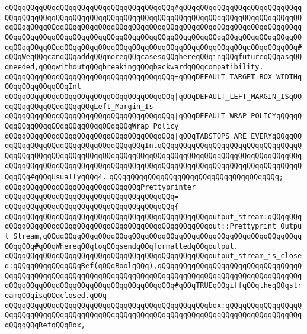 \verb|qQQqqQQqqQQqqQQqqQQqqQQqqQQqqQQqqQQqqQQq#qQQqqQQqqQQqqQQqqQQqqQQqqQQqqQQqqQQqqQQqqQQqqQQqqQQqqQQqqQQqqQQqqQQqqQQqqQQqqQQqqQQqqQQqqQQqqQQqqQQqqQQqqQQqqQQqqQQqqQQqqQQqqQQqqQQqqQQqqQQqqQQqqQQqqQQqqQQqqQQqqQQqqQQqqQQqqQQqqQQqqQQqqQQqqQQqqQQqqQQqqQQqqQQqqQQqqQQqqQQqqQQqqQQqqQQqqQQqqQQqqQQqqQQqqQQqqQQqqQQqqQQqqQQqqQQqqQQqqQQqqQQqqQQqqQQqqQQqqQQqqQQqqQQq#qQQqWeqQQqcanqQQqaddqQQqmoreqQQqcasesqQQqhereqQQqinqQQqfutureqQQqasqQQqneeded,qQQqwithoutqQQqbreakingqQQqbackwardqQQqcompatibility.|\newline
\verb|qQQqqQQqqQQqqQQqqQQqqQQqqQQqqQQqqQQqqQQq=qQQqDEFAULT_TARGET_BOX_WIDTHqQQqqQQqqQQqqQQqInt|\newline
\verb|qQQqqQQqqQQqqQQqqQQqqQQqqQQqqQQqqQQqqQQq|\verb#|qQQqDEFAULT_LEFT_MARGIN_ISqQQqqQQqqQQqqQQqqQQqqQQqLeft_Margin_Is#\newline
\verb|qQQqqQQqqQQqqQQqqQQqqQQqqQQqqQQqqQQqqQQq|\verb#|qQQqDEFAULT_WRAP_POLICYqQQqqQQqqQQqqQQqqQQqqQQqqQQqqQQqqQQqWrap_Policy#\newline
\verb|qQQqqQQqqQQqqQQqqQQqqQQqqQQqqQQqqQQqqQQq|\verb#|qQQqTABSTOPS_ARE_EVERYqQQqqQQqqQQqqQQqqQQqqQQqqQQqqQQqqQQqqQQqIntqQQqqQQqqQQqqQQqqQQqqQQqqQQqqQQqqQQqqQQqqQQqqQQqqQQqqQQqqQQqqQQqqQQqqQQqqQQqqQQqqQQqqQQqqQQqqQQqqQQqqQQqqQQqqQQqqQQqqQQqqQQqqQQqqQQqqQQqqQQqqQQqqQQqqQQqqQQqqQQqqQQqqQQqqQQqqQQqqQQq#\verb|#qQQqUsuallyqQQq4.|\newline
\verb|qQQqqQQqqQQqqQQqqQQqqQQqqQQqqQQqqQQqqQQq;|\newline
\newline
\verb|qQQqqQQqqQQqqQQqqQQqqQQqqQQqqQQqPrettyprinter|\newline
\verb|qQQqqQQqqQQqqQQqqQQqqQQqqQQqqQQqqQQqqQQq=|\newline
\verb|qQQqqQQqqQQqqQQqqQQqqQQqqQQqqQQqqQQqqQQq{|\newline
\verb|qQQqqQQqqQQqqQQqqQQqqQQqqQQqqQQqqQQqqQQqqQQqqQQqoutput_stream:qQQqqQQqqQQqqQQqqQQqqQQqqQQqqQQqqQQqqQQqqQQqqQQqqQQqqQQqout::Prettyprint_Output_Stream,qQQqqQQqqQQqqQQqqQQqqQQqqQQqqQQqqQQqqQQqqQQqqQQqqQQqqQQqqQQqqQQqqQQq#qQQqWhereqQQqtoqQQqsendqQQqformattedqQQqoutput.|\newline
\verb|qQQqqQQqqQQqqQQqqQQqqQQqqQQqqQQqqQQqqQQqqQQqqQQqoutput_stream_is_closed:qQQqqQQqqQQqqQQqRef(qQQqBoolqQQq),qQQqqQQqqQQqqQQqqQQqqQQqqQQqqQQqqQQqqQQqqQQqqQQqqQQqqQQqqQQqqQQqqQQqqQQqqQQqqQQqqQQqqQQqqQQqqQQqqQQqqQQqqQQqqQQqqQQqqQQqqQQqqQQqqQQqqQQqqQQqqQQq#qQQqTRUEqQQqiffqQQqtheqQQqstreamqQQqisqQQqclosed.qQQq|\newline
\newline
\verb|qQQqqQQqqQQqqQQqqQQqqQQqqQQqqQQqqQQqqQQqqQQqqQQqbox:qQQqqQQqqQQqqQQqqQQqqQQqqQQqqQQqqQQqqQQqqQQqqQQqqQQqqQQqqQQqqQQqqQQqqQQqqQQqqQQqqQQqqQQqqQQqqQQqRefqQQqBox,|\newline
